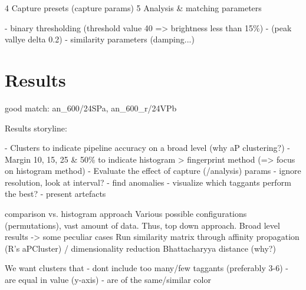 \documentclass[thesis.tex]{subfiles}
\begin{document}
4 Capture presets (capture params)
5 Analysis \& matching parameters

- binary thresholding (threshold value 40 => brightness less than 15\%)
- (peak vallye delta 0.2)
- similarity parameters (damping...)

\section{Results}
\label{chapter:results}

good match: an\_600/24SPa, an\_600\_r/24VPb

Results storyline:

- Clusters to indicate pipeline accuracy on a broad level (why aP clustering?)
- Margin 10, 15, 25 \& 50\% to indicate histogram > fingerprint method (=> focus on histogram method)
- Evaluate the effect of capture (/analysis) params
  - ignore resolution, look at interval?
  - find anomalies
  - visualize which taggants perform the best?
- present artefacts

comparison vs. histogram approach
Various possible configurations (permutations), vast amount of data. Thus, top down approach. Broad level results -> some peculiar cases
Run similarity matrix through affinity propagation (R's aPCluster) / dimensionality reduction
Bhattacharyya distance (why?)

We want clusters that
- dont include too many/few taggants (preferably 3-6)
- are equal in value (y-axis)
- are of the same/similar color
\end{document}
